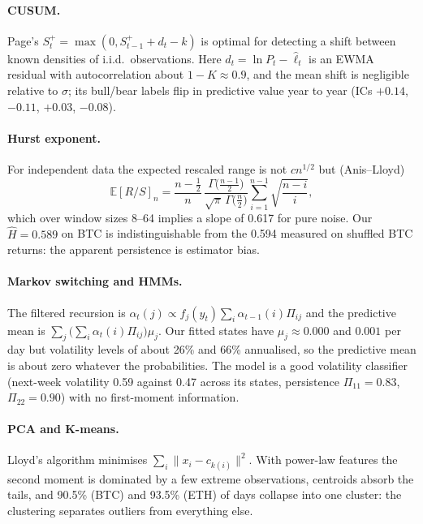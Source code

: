 \documentclass[11pt,a4paper]{article}
\theoremstyle{definition}
\begin{document}
\paragraph{CUSUM.} Page's $S^+_t=\max(0,S^+_{t-1}+d_t-k)$ is optimal for detecting a shift between known densities of i.i.d.\ observations. Here $d_t=\ln P_t-\hat\ell_t$ is an EWMA residual with autocorrelation about $1-K\approx0.9$, and the mean shift is negligible relative to $\sigma$; its bull/bear labels flip in predictive value year to year (ICs $+0.14$, $-0.11$, $+0.03$, $-0.08$).

\paragraph{Hurst exponent.} For independent data the expected rescaled range is not $cn^{1/2}$ but (Anis--Lloyd)
\begin{equation}
\mathbb E[R/S]_n=\frac{n-\frac12}{n}\,\frac{\Gamma\bigl(\frac{n-1}{2}\bigr)}{\sqrt\pi\,\Gamma\bigl(\frac n2\bigr)}\sum_{i=1}^{n-1}\sqrt{\frac{n-i}{i}},
\end{equation}
which over window sizes 8--64 implies a slope of 0.617 for pure noise. Our $\hat H=0.589$ on BTC is indistinguishable from the 0.594 measured on shuffled BTC returns: the apparent persistence is estimator bias.

\paragraph{Markov switching and HMMs.} The filtered recursion is $\alpha_t(j)\propto f_j(y_t)\sum_i\alpha_{t-1}(i)\Pi_{ij}$ and the predictive mean is $\sum_j\bigl(\sum_i\alpha_t(i)\Pi_{ij}\bigr)\mu_j$. Our fitted states have $\mu_j\approx0.000$ and $0.001$ per day but volatility levels of about 26\% and 66\% annualised, so the predictive mean is about zero whatever the probabilities. The model is a good volatility classifier (next-week volatility 0.59 against 0.47 across its states, persistence $\Pi_{11}=0.83$, $\Pi_{22}=0.90$) with no first-moment information.

\paragraph{PCA and K-means.} Lloyd's algorithm minimises $\sum_i\lVert x_i-c_{k(i)}\rVert^2$. With power-law features the second moment is dominated by a few extreme observations, centroids absorb the tails, and 90.5\% (BTC) and 93.5\% (ETH) of days collapse into one cluster: the clustering separates outliers from everything else.
\end{document}
